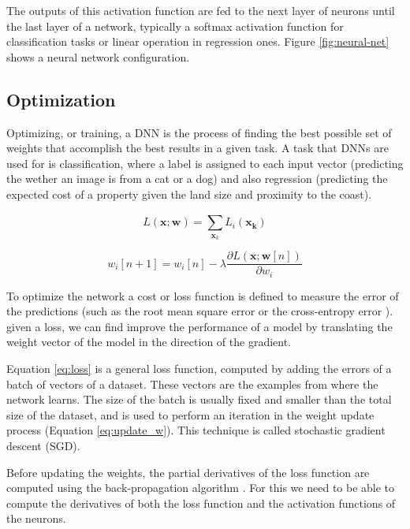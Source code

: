 The outputs of this activation function are fed to the next layer of neurons until the last layer of a network, typically a softmax activation function for classification tasks or linear operation in regression ones. Figure \ref{fig:neural-net} shows a neural network configuration.

\subsection{Optimization}

Optimizing, or training, a DNN is the process of finding the best possible set of weights that accomplish the best results in a given task. A task that DNNs are used for is classification, where a label is assigned to each input vector (predicting the wether an image is from a cat or a dog) and also regression (predicting the expected cost of a property given the land size and proximity to the coast).

\begin{equation}
    L(\mathbf{x}; \mathbf{w}) = \sum_{\mathbf{x}_k}^{} L_i (\mathbf{x_k})
    \label{eq:loss}
\end{equation}

\begin{equation}
    w_i[n+1] = w_i[n] - \lambda \frac{\partial L(\mathbf{x}; \mathbf{w}[n])}{\partial w_i}
    \label{eq:update_w}
\end{equation}

To optimize the network a cost or loss function is defined to measure the error of the predictions (such as the root mean square error or the cross-entropy error \cite{golik2013cross}). given a loss, we can find improve the performance of a model by translating the weight vector of the model in the direction of the gradient.

Equation \ref{eq:loss} is a general loss function, computed by adding the errors of a batch of vectors of a dataset. These vectors are the examples from where the network learns. The size of the batch is usually fixed and smaller than the total size of the dataset, and is used to perform an iteration in the weight update process (Equation \ref{eq:update_w}). This technique is called stochastic gradient descent \cite{bottou2010large} (SGD).

Before updating the weights, the partial derivatives of the loss function are computed using the back-propagation algorithm \cite{chauvin1995backpropagation}. For this we need to be able to compute the derivatives of both the loss function and the activation functions of the neurons.

